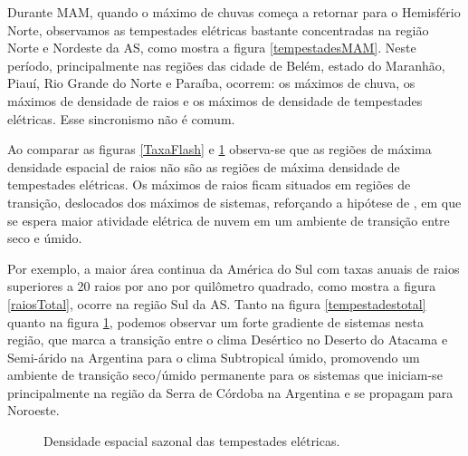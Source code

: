 Durante MAM, quando o máximo de chuvas começa a retornar para o Hemisfério Norte, observamos as tempestades elétricas bastante concentradas na região Norte e Nordeste da AS, como mostra a figura \ref{tempestadesMAM}. Neste período, principalmente nas regiões das cidade de Belém, estado do Maranhão, Piauí, Rio Grande do Norte e Paraíba,  ocorrem: os máximos de chuva, os máximos de densidade de raios e os máximos de densidade de tempestades elétricas. Esse sincronismo não é comum.

Ao comparar as figuras \ref{TaxaFlash} e \ref{DensidadeTempestadesSazonal} observa-se que as regiões de máxima densidade espacial de raios não são as regiões de máxima densidade de tempestades elétricas. Os máximos de raios ficam situados em regiões de transição, deslocados dos máximos de sistemas, reforçando a hipótese de , em que se espera maior atividade elétrica de nuvem em um ambiente de transição entre seco e úmido.

Por exemplo, a maior área continua da América do Sul com taxas anuais de raios superiores a 20 raios por ano por quilômetro quadrado, como mostra a figura \ref{raiosTotal}, ocorre na região Sul da AS. Tanto na figura \ref{tempestadestotal} quanto na figura \ref{DensidadeTempestadesSazonal}, podemos observar um forte gradiente de sistemas nesta região, que marca a transição entre o clima Desértico no Deserto do Atacama e Semi-árido na Argentina para o clima Subtropical úmido, promovendo um ambiente de transição seco/úmido permanente para os sistemas que iniciam-se principalmente na região da Serra de Córdoba na Argentina e se propagam para Noroeste.

\begin{figure}[!ht]
  \caption{Densidade espacial sazonal das tempestades elétricas.}
\label{DensidadeTempestadesSazonal}
\end{figure} 

